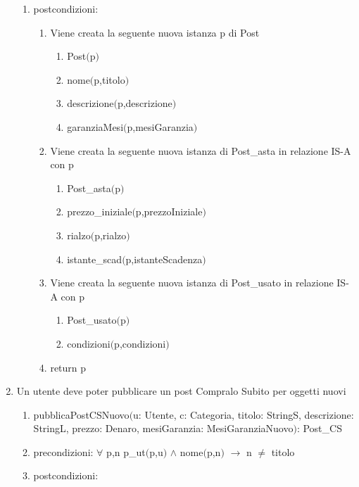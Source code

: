 \documentclass{article}
\begin{document}
\begin{enumerate}
\begin{enumerate}
        \item postcondizioni:
        \begin{enumerate}
            \item Viene creata la seguente nuova istanza p di Post
            \begin{enumerate}
                \item Post$($p$)$
                \item nome$($p,titolo$)$
                \item descrizione$($p,descrizione$)$
                \item garanziaMesi$($p,mesiGaranzia$)$
            \end{enumerate}
            \item Viene creata la seguente nuova istanza di Post\_asta in relazione IS-A con p
            \begin{enumerate}
                \item Post\_asta$($p$)$
                \item prezzo\_iniziale$($p,prezzoIniziale$)$
                \item rialzo$($p,rialzo$)$
                \item istante\_scad$($p,istanteScadenza$)$
            \end{enumerate}
            \item Viene creata la seguente nuova istanza di Post\_usato in relazione IS-A con p
            \begin{enumerate}
                \item Post\_usato$($p$)$
                \item condizioni$($p,condizioni$)$
            \end{enumerate}
            \item return p
        \end{enumerate}
    \end{enumerate}
    \item Un utente deve poter pubblicare un post Compralo Subito per oggetti nuovi
    \begin{enumerate}
        \item pubblicaPostCSNuovo$($u: Utente, c: Categoria, titolo: StringS, descrizione: StringL, prezzo: Denaro, mesiGaranzia: MesiGaranziaNuovo$)$: Post\_CS
        \item precondizioni: $\forall$ p,n p\_ut$($p,u$)$ $\land$ nome$($p,n$)$ $\rightarrow$ n $\neq$ titolo
        \item postcondizioni:

\end{enumerate}
\end{enumerate}
\end{document}
